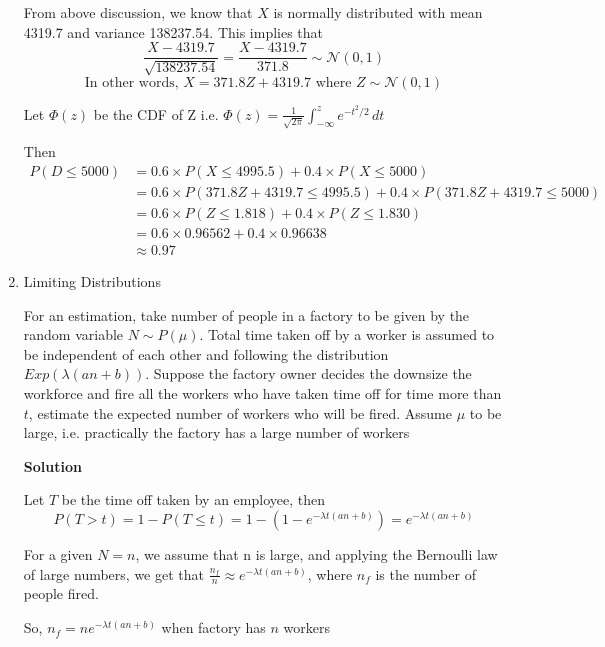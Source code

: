 \documentclass[12pt, oneside]{article}
\begin{document}
\begin{enumerate}
{    From above discussion, we know that \(X\) is normally distributed with mean 4319.7 
    and variance 138237.54. This implies that
    \[\frac{X - 4319.7}{\sqrt{138237.54}} = \frac{X - 4319.7}{371.8} \sim \mathcal{N}(0, 1)\]
    \[\text{In other words, } X = 371.8 Z + 4319.7 \text{ where } Z \sim \mathcal{N}(0, 1)\]

    Let \(\Phi(z)\) be the CDF of Z i.e. \(\Phi(z) = \frac{1}{\sqrt{2\pi}} \int_{-\infty}^{z} e^{-t^2/2} \,dt\)

    Then
    \begin{align*}
        P(D \leq 5000) &= 0.6 \times P(X \leq 4995.5) + 0.4 \times P(X \leq 5000) \\
            &= 0.6 \times P(371.8 Z + 4319.7 \leq 4995.5) + 0.4 \times P(371.8 Z + 4319.7 \leq 5000) \\
            &= 0.6 \times P(Z \leq 1.818) + 0.4 \times P(Z \leq 1.830) \\
            &= 0.6 \times 0.96562 + 0.4 \times 0.96638 \\
            &\approx 0.97
    \end{align*}

}

\item {
    Limiting Distributions

    For an estimation, take number of people in a factory to be given by the random variable
    \(N \sim P(\mu)\). Total time taken off by a worker is assumed to be independent of each other
    and following the distribution \(Exp(\lambda (an + b))\). Suppose
    the factory owner decides the downsize the workforce and fire all the workers who have taken
    time off for time more than \(t\), estimate the expected number of workers who will be fired.
    Assume \(\mu\) to be large, i.e. practically the factory has a large number of workers

    \textbf{Solution}

    Let \(T\) be the time off taken by an employee, then
    \[
        P(T > t) = 1 - P(T \leq t) = 1 - (1 - e^{-\lambda t(an + b)}) = e^{-\lambda t(an + b)}
    \]

    For a given \(N = n\), we assume that n is large, and applying the Bernoulli law of
    large numbers, we get that \(\frac{n_f}{n} \approx e^{-\lambda t(an + b)}\), 
    where \(n_f\) is the number of people fired.

    So, \(n_f = n e^{-\lambda t(an + b)}\) when factory has \(n\) workers

}
\end{enumerate}
\end{document}
